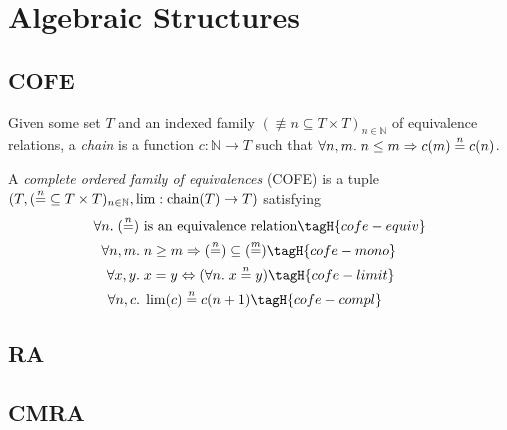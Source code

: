 \section{Algebraic Structures}

\subsection{COFE}

\begin{defn}[Chain]
  Given some set $T$ and an indexed family $({\nequiv{n}} \subseteq T \times T)_{n \in \mathbb{N}}$ of equivalence relations, a \emph{chain} is a function $c : \mathbb{N} \to T$ such that $\All n, m. n \leq m \Ra c (m) \nequiv{n} c (n)$.
\end{defn}

\begin{defn}
  A \emph{complete ordered family of equivalences} (COFE) is a tuple $(T, ({\mathrel{\stackrel{n}{=}}} \subseteq T \times T)_{n \in \mathbb{N}}, \lim : \mathrm{chain}(T) \to T)$ satisfying
  \begin{align*}
    \All n. (\nequiv{n}) ~& \text{is an equivalence relation} \tagH{cofe-equiv} \\
    \All n, m.& n \geq m \Ra (\nequiv{n}) \subseteq (\nequiv{m}) \tagH{cofe-mono} \\
    \All x, y.& x = y \Lra (\All n. x \nequiv{n} y) \tagH{cofe-limit} \\
    \All n, c.& \lim(c) \nequiv{n} c(n+1) \tagH{cofe-compl}
  \end{align*}
\end{defn}



\subsection{RA}


\subsection{CMRA}

